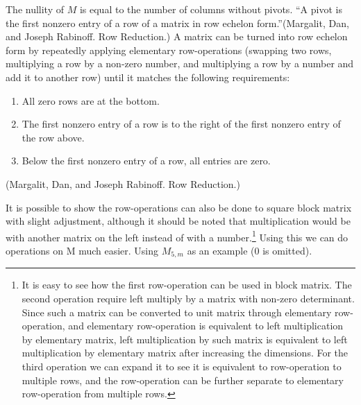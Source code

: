 \documentclass[a4paper, 12pt]{article}
\begin{document}
The nullity of $M$ is equal to the number of columns without pivots. ``A pivot is the first nonzero entry of a row of a matrix in row echelon form.”(Margalit, Dan, and Joseph Rabinoff. Row Reduction.) A matrix can be turned into row echelon form by repeatedly applying elementary row-operations (swapping two rows, multiplying a row by a non-zero number, and multiplying a row by a number and add it to another row) until it matches the following requirements:
\vspace{-1.5cm}
\begin{singlespace}
\begin{enumerate}
  \item All zero rows are at the bottom.
  \item The first nonzero entry of a row is to the right of the first nonzero entry of the row above.
  \item Below the first nonzero entry of a row, all entries are zero.
\end{enumerate}
\end{singlespace}
\vspace{-1cm}
(Margalit, Dan, and Joseph Rabinoff. Row Reduction.)

 It is possible to show the row-operations can also be done to square block matrix with slight adjustment, although it should be noted that multiplication would be with another matrix on the left instead of with a number.\footnote{It is easy to see how the first row-operation can be used in block matrix. The second operation require left multiply by a matrix with non-zero determinant. Since such a matrix can be converted to unit matrix through elementary row-operation, and elementary row-operation is equivalent to left multiplication by elementary matrix, left multiplication by such matrix is equivalent to left multiplication by elementary matrix after increasing the dimensions. For the third operation we can expand it to see it is equivalent to row-operation to multiple rows, and the row-operation can be further separate to elementary row-operation from multiple rows.} Using this we can do operations on M much easier. Using $M_{5, m}$ as an example (0 is omitted).
\end{document}
